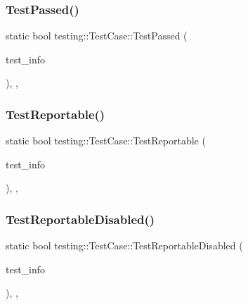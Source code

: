\mbox{\label{classtesting_1_1_test_case_ad8d9e1ebc410000b679002ba71d78686}} 
\subsubsection{\texorpdfstring{TestPassed()}{TestPassed()}}
{\footnotesize\ttfamily static bool testing\+::\+Test\+Case\+::\+Test\+Passed (\begin{DoxyParamCaption}\item[{const \mbox{\hyperlink{classtesting_1_1_test_info}{Test\+Info}} $\ast$}]{test\+\_\+info }\end{DoxyParamCaption})\hspace{0.3cm}{\ttfamily [inline]}, {\ttfamily [static]}, {\ttfamily [private]}}

\mbox{\label{classtesting_1_1_test_case_a2c3767df71e07939b32f19ef9c6ed271}} 
\subsubsection{\texorpdfstring{TestReportable()}{TestReportable()}}
{\footnotesize\ttfamily static bool testing\+::\+Test\+Case\+::\+Test\+Reportable (\begin{DoxyParamCaption}\item[{const \mbox{\hyperlink{classtesting_1_1_test_info}{Test\+Info}} $\ast$}]{test\+\_\+info }\end{DoxyParamCaption})\hspace{0.3cm}{\ttfamily [inline]}, {\ttfamily [static]}, {\ttfamily [private]}}

\mbox{\label{classtesting_1_1_test_case_a1f2da5337f941d746dfcb98bc4acc149}} 
\subsubsection{\texorpdfstring{TestReportableDisabled()}{TestReportableDisabled()}}
{\footnotesize\ttfamily static bool testing\+::\+Test\+Case\+::\+Test\+Reportable\+Disabled (\begin{DoxyParamCaption}\item[{const \mbox{\hyperlink{classtesting_1_1_test_info}{Test\+Info}} $\ast$}]{test\+\_\+info }\end{DoxyParamCaption})\hspace{0.3cm}{\ttfamily [inline]}, {\ttfamily [static]}, {\ttfamily [private]}}

